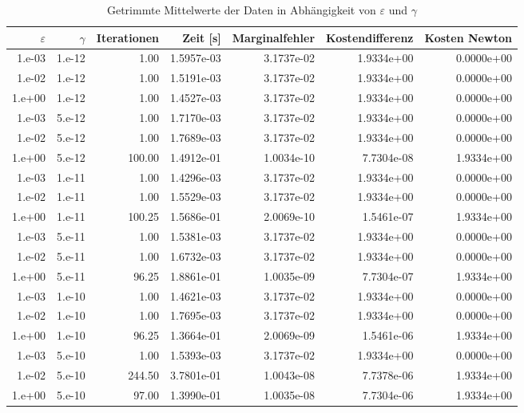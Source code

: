\begin{table}[htbp]
\caption{Getrimmte Mittelwerte der Daten in Abhängigkeit von $\varepsilon$ und $\gamma$}
\label{tab:Parametertest64_kleinereParameter}
\small
\centering
{}
\begin{tabular}{rrrrrrr}
\toprule
$\varepsilon$ & $\gamma$ & Iterationen & Zeit [s] & Marginalfehler & Kostendifferenz & Kosten Newton \\
\midrule
1.e-03 & 1.e-12 & 1.00 & 1.5957e-03 & 3.1737e-02 & 1.9334e+00 & 0.0000e+00 \\
1.e-02 & 1.e-12 & 1.00 & 1.5191e-03 & 3.1737e-02 & 1.9334e+00 & 0.0000e+00 \\
1.e+00 & 1.e-12 & 1.00 & 1.4527e-03 & 3.1737e-02 & 1.9334e+00 & 0.0000e+00 \\
1.e-03 & 5.e-12 & 1.00 & 1.7170e-03 & 3.1737e-02 & 1.9334e+00 & 0.0000e+00 \\
1.e-02 & 5.e-12 & 1.00 & 1.7689e-03 & 3.1737e-02 & 1.9334e+00 & 0.0000e+00 \\
1.e+00 & 5.e-12 & 100.00 & 1.4912e-01 & 1.0034e-10 & 7.7304e-08 & 1.9334e+00 \\
1.e-03 & 1.e-11 & 1.00 & 1.4296e-03 & 3.1737e-02 & 1.9334e+00 & 0.0000e+00 \\
1.e-02 & 1.e-11 & 1.00 & 1.5529e-03 & 3.1737e-02 & 1.9334e+00 & 0.0000e+00 \\
1.e+00 & 1.e-11 & 100.25 & 1.5686e-01 & 2.0069e-10 & 1.5461e-07 & 1.9334e+00 \\
1.e-03 & 5.e-11 & 1.00 & 1.5381e-03 & 3.1737e-02 & 1.9334e+00 & 0.0000e+00 \\
1.e-02 & 5.e-11 & 1.00 & 1.6732e-03 & 3.1737e-02 & 1.9334e+00 & 0.0000e+00 \\
1.e+00 & 5.e-11 & 96.25 & 1.8861e-01 & 1.0035e-09 & 7.7304e-07 & 1.9334e+00 \\
1.e-03 & 1.e-10 & 1.00 & 1.4621e-03 & 3.1737e-02 & 1.9334e+00 & 0.0000e+00 \\
1.e-02 & 1.e-10 & 1.00 & 1.7695e-03 & 3.1737e-02 & 1.9334e+00 & 0.0000e+00 \\
1.e+00 & 1.e-10 & 96.25 & 1.3664e-01 & 2.0069e-09 & 1.5461e-06 & 1.9334e+00 \\
1.e-03 & 5.e-10 & 1.00 & 1.5393e-03 & 3.1737e-02 & 1.9334e+00 & 0.0000e+00 \\
1.e-02 & 5.e-10 & 244.50 & 3.7801e-01 & 1.0043e-08 & 7.7378e-06 & 1.9334e+00 \\
1.e+00 & 5.e-10 & 97.00 & 1.3990e-01 & 1.0035e-08 & 7.7304e-06 & 1.9334e+00 \\

\end{tabular}
\end{table}

